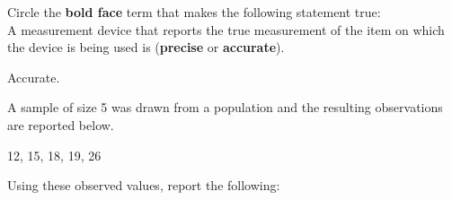 \documentclass{examsetup}\usepackage[]{graphicx}\usepackage[]{color}
\begin{document}



\examCoverPage

\begin{questions}

\question[2] 

Circle the \textbf{bold face} term that makes the following statement true: \\

A measurement device that reports the true measurement of the item on which the device is being used is (\textbf{precise} or \textbf{accurate}).

\begin{solution}
   Accurate.
\end{solution}

\question 



A sample of size 5 was drawn from a population and the resulting observations are reported below. 
\begin{center}
12, 15, 18, 19, 26
\end{center}
Using these observed values, report the following:
\vspace{1cm}

\end{questions}
\end{document}
